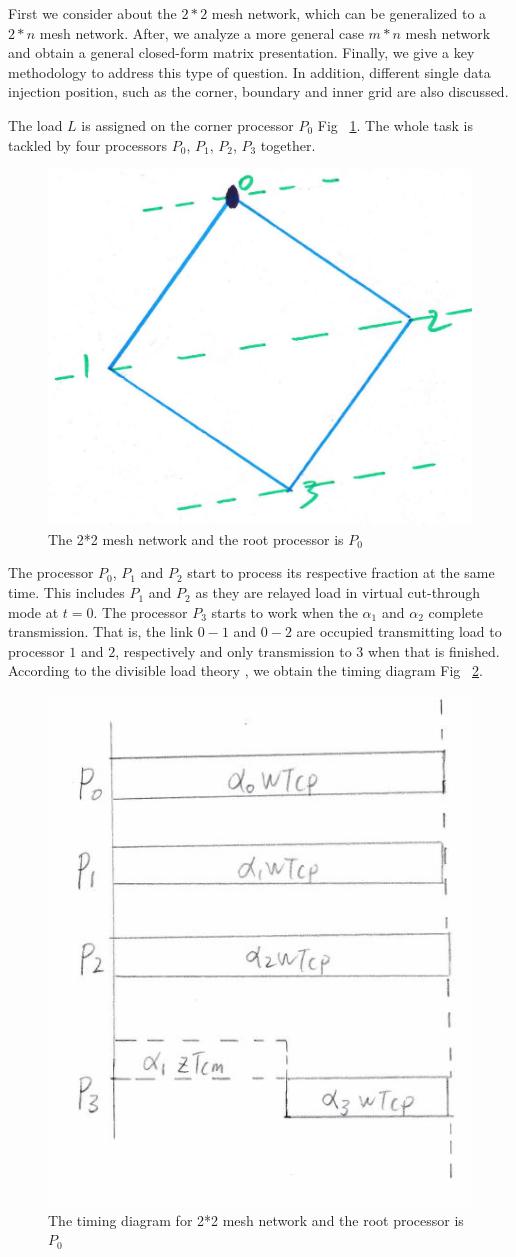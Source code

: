 First we consider about the $2*2$ mesh network,  which can be generalized to a $2*n$ mesh network.  After, we analyze a more general case $m*n$ mesh network and obtain a general closed-form matrix presentation.  Finally, we give a key methodology to address this type of question.  In addition, different single data injection position, such as the corner, boundary and inner grid are also discussed.  

The load $L$ is assigned on the corner processor $P_{0}$ Fig ~\ref{fig:2t2}.  The whole task is tackled by four processors $P_{0}$, $P_{1}$, $P_{2}$, $P_{3}$ together.  

\begin{figure}[!ht]
\centering
\includegraphics[width=0.5\columnwidth]{figure/2t2.JPG}
\caption{The 2*2 mesh network and the root processor is $P_{0}$}
\label{fig:2t2}
\end{figure}

The processor $P_{0}$, $P_{1}$ and $P_{2}$ start to process its respective fraction at the same time.  This includes $P_{1}$ and $P_{2}$ as they are relayed load in virtual cut-through mode at $t = 0$.  The processor $P_{3}$ starts to work when the $\alpha_{1}$ and $\alpha_{2}$ complete transmission.  That is, the link $0-1$ and $0-2$ are occupied 
transmitting load to processor $1$ and $2$, respectively and only transmission to $3$ when that is finished.
According to the divisible load theory  \cite{bharadwaj2003divisible}, we obtain the timing diagram Fig ~\ref{fig:2t2d}.  

\begin{figure}[!ht]
\centering
\includegraphics[width=0.5\columnwidth]{figure/2t2d.JPG}
\caption{The timing diagram for 2*2 mesh network and the root processor is $P_{0}$}
\label{fig:2t2d}
\end{figure}

